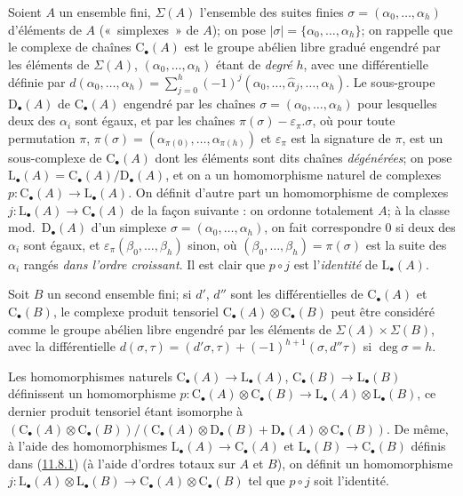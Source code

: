 \begin{env}[11.8.1]
\label{0.11.8.1-fr}
Soient $A$ un ensemble fini, $\Sigma(A)$ l'ensemble des suites finies
$\sigma=(\alpha_0,\ldots,\alpha_h)$ d'éléments de $A$ («~simplexes~» de
$A$); on pose $|\sigma|=\{\alpha_0,\ldots,\alpha_h\}$; on rappelle que le
complexe de chaînes $\mathrm C_\bullet(A)$ est le groupe abélien libre
gradué engendré par les éléments de $\Sigma(A)$,
$(\alpha_0,\ldots,\alpha_h)$ étant de \emph{degré} $h$, avec une différentielle
définie par
$d(\alpha_0,\ldots,\alpha_h)=\sum_{j=0}^{h}(-1)^j(\alpha_0,\ldots,\widehat{\alpha}_j,\ldots,\alpha_h)$.
Le sous-groupe $\mathrm D_\bullet(A)$ de $\mathrm C_\bullet(A)$ engendré par
les chaînes $\sigma=(\alpha_0,\ldots,\alpha_h)$ pour lesquelles deux des
$\alpha_i$ sont égaux, et par les chaînes
$\pi(\sigma)-\varepsilon_\pi.\sigma$, où pour toute permutation $\pi$,
$\pi(\sigma)=(\alpha_{\pi(0)},\ldots,\alpha_{\pi(h)})$
et $\varepsilon_\pi$ est la signature de $\pi$, est un sous-complexe de
$\mathrm C_\bullet(A)$ dont les éléments sont dits chaînes
\emph{dégénérées}; on pose
$\mathrm L_\bullet(A)=\mathrm C_\bullet(A)/\mathrm D_\bullet(A)$, et on a un
homomorphisme naturel de complexes
$p:\mathrm C_\bullet(A)\longrightarrow\mathrm L_\bullet(A)$.
On définit d'autre part un homomorphisme de complexes
$j:\mathrm L_\bullet(A)\longrightarrow\mathrm C_\bullet(A)$
de la façon suivante : on ordonne totalement $A$; à la classe
mod.~$\mathrm D_\bullet(A)$ d'un simplexe
$\sigma=(\alpha_0,\ldots,\alpha_h)$, on fait correspondre $0$ si deux des
$\alpha_i$ sont égaux, et $\varepsilon_\pi(\beta_0,\ldots,\beta_h)$ sinon, où
$(\beta_0,\ldots,\beta_h)=\pi(\sigma)$ est la suite des $\alpha_i$ rangés \emph{dans l'ordre croissant}. Il est clair que $p\circ
j$ est l'\emph{identité} de $\mathrm L_\bullet(A)$.
\end{env}

\begin{env}[11.8.2]
\label{0.11.8.2-fr}
Soit $B$ un second ensemble fini; si $d'$, $d''$ sont les différentielles de
$\mathrm C_\bullet(A)$ et $\mathrm C_\bullet(B)$, le complexe produit
tensoriel $\mathrm C_\bullet(A)\otimes\mathrm C_\bullet(B)$ peut être
considéré comme le groupe abélien libre engendré par les éléments de
$\Sigma(A)\times\Sigma(B)$, avec la différentielle
$d(\sigma,\tau)=(d'\sigma,\tau)+(-1)^{h+1}(\sigma,d''\tau)$ si $\deg\sigma=h$.

Les homomorphismes naturels
$\mathrm C_\bullet(A)\to\mathrm L_\bullet(A)$,
$\mathrm C_\bullet(B)\to\mathrm L_\bullet(B)$ définissent un homomorphisme
$p:\mathrm C_\bullet(A)\otimes\mathrm C_\bullet(B)\longrightarrow\mathrm L_\bullet(A)\otimes\mathrm L_\bullet(B)$,
ce dernier produit tensoriel étant isomorphe à
$(\mathrm C_\bullet(A)\otimes\mathrm C_\bullet(B))/(\mathrm C_\bullet(A)\otimes\mathrm D_\bullet(B)+\mathrm D_\bullet(A)\otimes\mathrm C_\bullet(B))$.
De même, à l'aide des homomorphismes
$\mathrm L_\bullet(A)\to\mathrm C_\bullet(A)$ et
$\mathrm L_\bullet(B)\to\mathrm C_\bullet(B)$ définis dans
(\hyperref[0.11.8.1-fr]{11.8.1}) (à l'aide d'ordres totaux sur $A$ et $B$),
on définit un homomorphisme
$j:\mathrm L_\bullet(A)\otimes\mathrm L_\bullet(B)\longrightarrow\mathrm C_\bullet(A)\otimes\mathrm C_\bullet(B)$
tel que $p\circ j$ soit l'identité.
\end{env}

